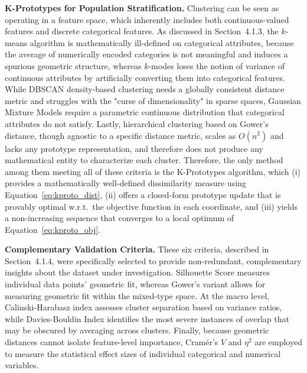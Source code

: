 \textbf{K-Prototypes for Population Stratification.} Clustering can be seen as operating in a feature space, which inherently includes both continuous-valued features and discrete categorical features. As discussed in Section~4.1.3, the $k$-means algorithm is mathematically ill-defined on categorical attributes, because the average of numerically encoded categories is not meaningful and induces a spurious geometric structure, whereas $k$-modes loses the notion of variance of continuous attributes by artificially converting them into categorical features. While DBSCAN density-based clustering needs a globally consistent distance metric and struggles with the "curse of dimensionality" in sparse spaces, Gaussian Mixture Models require a parametric continuous distribution that categorical attributes do not satisfy. Lastly, hierarchical clustering based on Gower's distance, though agnostic to a specific distance metric, scales as $O(n^2)$ and lacks any prototype representation, and therefore does not produce any mathematical entity to characterize each cluster. Therefore, the only method among them meeting all of these criteria is the K-Prototypes algorithm, which (i) provides a mathematically well-defined dissimilarity measure using Equation~\eqref{eq:kproto_dist}, (ii) offers a closed-form prototype update that is provably optimal w.r.t.\ the objective function in each coordinate, and (iii) yields a non-increasing sequence that converges to a local optimum of Equation~\eqref{eq:kproto_obj}.

\textbf{Complementary Validation Criteria.} These six criteria, described in Section~4.1.4, were specifically selected to provide non-redundant, complementary insights about the dataset under investigation. Silhouette Score measures individual data points' geometric fit, whereas Gower's variant allows for measuring geometric fit within the mixed-type space. At the macro level, Calinski-Harabasz index assesses cluster separation based on variance ratios, while Davies-Bouldin Index identifies the most severe instances of overlap that may be obscured by averaging across clusters. Finally, because geometric distances cannot isolate feature-level importance, Cramér's $V$ and $\eta^2$ are employed to measure the statistical effect sizes of individual categorical and numerical variables.

